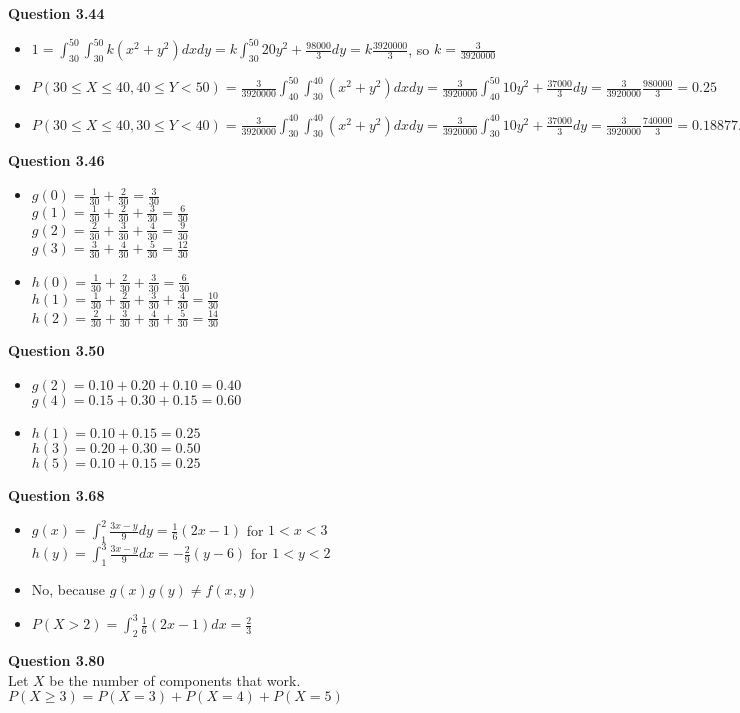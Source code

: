 \documentclass{article}
\begin{document}
    \textbf{Question 3.44}
    \begin{itemize}
        \item $1=\int_{30}^{50}\int_{30}^{50}k(x^2+y^2)dxdy = k\int_{30}^{50}20y^2+\frac{98000}{3}dy = k\frac{3920000}{3}$, so $k= \frac{3}{3920000}$
        \item $P(30\leq X \leq 40, 40\leq Y < 50) = \frac{3}{3920000}\int_{40}^{50}\int_{30}^{40}(x^2+y^2)dxdy = \frac{3}{3920000}\int_{40}^{50}10y^2+\frac{37000}{3}dy = \frac{3}{3920000}\frac{980000}{3} = 0.25$
        \item $P(30\leq X \leq 40, 30\leq Y < 40) = \frac{3}{3920000}\int_{30}^{40}\int_{30}^{40}(x^2+y^2)dxdy = \frac{3}{3920000}\int_{30}^{40}10y^2+\frac{37000}{3}dy = \frac{3}{3920000}\frac{740000}{3} = 0.18877...$
    \end{itemize}
    \textbf{Question 3.46}
    \begin{itemize}
        \item $g(0)=\frac{1}{30}+\frac{2}{30} = \frac{3}{30}$\\
              $g(1)=\frac{1}{30}+\frac{2}{30}+\frac{3}{30}=\frac{6}{30}$\\
              $g(2)=\frac{2}{30}+\frac{3}{30}+\frac{4}{30}=\frac{9}{30}$\\
              $g(3)=\frac{3}{30}+\frac{4}{30}+\frac{5}{30}=\frac{12}{30}$
        \item $h(0)=\frac{1}{30}+\frac{2}{30}+\frac{3}{30}=\frac{6}{30}$\\
              $h(1)=\frac{1}{30}+\frac{2}{30}+\frac{3}{30}+\frac{4}{30}=\frac{10}{30}$\\
              $h(2)=\frac{2}{30}+\frac{3}{30}+\frac{4}{30}+\frac{5}{30}=\frac{14}{30}$
    \end{itemize}
    \textbf{Question 3.50}
    \begin{itemize}
        \item $g(2) = 0.10+0.20+0.10=0.40$\\
              $g(4) = 0.15+0.30+0.15=0.60$
        \item $h(1) = 0.10+0.15=0.25$\\
              $h(3) = 0.20+0.30=0.50$\\
              $h(5) = 0.10+0.15=0.25$
    \end{itemize}
    \textbf{Question 3.68}
    \begin{itemize}
        \item $g(x)=\int_{1}^{2}\frac{3x-y}{9}dy = \frac{1}{6}(2x-1)$ for $1<x<3$\\
              $h(y)=\int_{1}^{3}\frac{3x-y}{9}dx = -\frac{2}{9}(y-6)$ for $1<y<2$
        \item No, because $g(x)g(y)\not= f(x,y)$
        \item $P(X>2) = \int_{2}^{3}\frac{1}{6}(2x-1)dx = \frac{2}{3}$
    \end{itemize}
    \textbf{Question 3.80}\\
    Let $X$ be the number of components that work. $P(X\geq 3) = P(X=3) + P(X=4) + P(X=5)$
\end{document}
